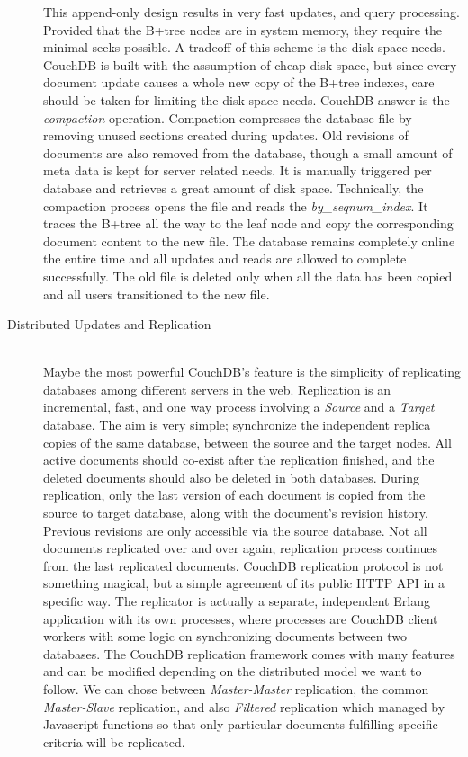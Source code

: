\begin{description}
    This append-only design results in very fast updates, and query processing.
    Provided that the B+tree nodes are in system memory, they require the
    minimal seeks possible. A tradeoff of this scheme is the disk space needs.
    CouchDB is built with the assumption of cheap disk space, but since every
    document update causes a whole new copy of the B+tree indexes, care should
    be taken for limiting the disk space needs. CouchDB answer is the
    \emph{compaction} operation. Compaction compresses the database file by
    removing unused sections created during updates. Old revisions of documents
    are also removed from the database, though a small amount of meta data is
    kept for server related needs. It is manually triggered per
    database and retrieves a great amount of disk space. Technically, the
    compaction process opens the file and reads the \emph{by\_seqnum\_index}.
    It traces the B+tree all the way to the leaf node and
    copy the corresponding document content to the new file. The database
    remains completely online the entire time and all updates and reads are
    allowed to complete successfully. The old file is deleted only when all the
    data has been copied and all users transitioned to the new file.
  \newpage
  \item[Distributed Updates and Replication]\label{item:replication} \hfill \\
    Maybe the most powerful CouchDB's feature is the simplicity of replicating
    databases among different servers in the web. Replication is an incremental,
    fast, and one way process involving a \emph{Source} and a \emph{Target}
    database. The aim is very simple; synchronize the independent replica copies
    of the same database, between the source and the target nodes. All active
    documents should co-exist after the replication finished, and the deleted
    documents should also be deleted in both databases. During replication, only
    the last version of each document is copied from the source to target
    database, along with the document's revision history.
    Previous revisions are only accessible via the source database. Not
    all documents replicated over and over again, replication process continues
    from the last replicated documents. CouchDB replication protocol is not
    something magical, but a simple agreement of its public HTTP API in a
    specific way. The replicator is actually a separate, independent Erlang
    application with its own processes, where processes are CouchDB client
    workers with some logic on synchronizing documents between two databases.
    The CouchDB replication framework comes with many features and can be
    modified depending on the distributed model we want to follow. We can chose
    between \emph{Master-Master} replication, the common \emph{Master-Slave}
    replication, and also \emph{Filtered} replication which managed by
    Javascript functions so that only particular documents fulfilling specific
    criteria will be replicated.


\end{description}

